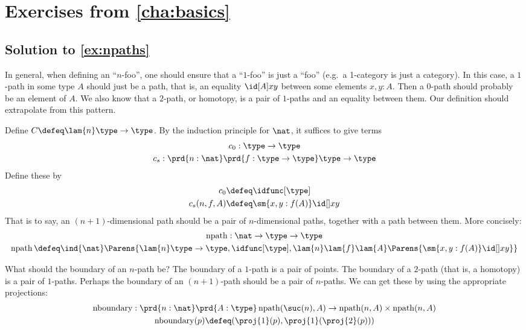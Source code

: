\documentclass[
%
%
11pt %
]{article}
\begin{document}
\section*{Exercises from \cref{cha:basics}}

\subsection*{Solution to \cref{ex:npaths}}

In general, when defining an ``$n$-foo'', one should ensure that a ``$1$-foo''
is just a ``foo'' (e.g.\ a 1-category is just a category). In this case, a
$1$-path in some type $A$ should just be a path, that is, an equality $\id[A]
xy$ between some elements $x,y:A$. Then a 0-path should probably be an
element of $A$. We also know that a $2$-path, or homotopy, is a pair of
$1$-paths and an equality between them. Our definition should extrapolate from
this pattern. 

Define $C\defeq \lam{n}\type\to\type$. By the induction principle for $\nat$, it
suffices to give terms
\begin{gather*}
  c_0 : \type\to\type \\
  c_s : \prd{n:\nat}\prd{f:\type\to\type}\type\to\type
\end{gather*}
Define these by
\begin{align*}
  c_0 &\defeq \idfunc[\type] \\
  c_s(n,f,A) &\defeq \sm{x,y:f(A)}\id[]xy
\end{align*}
That is to say, an $(n+1)$-dimensional path should be a pair of $n$-dimensional
paths, together with a path between them. More concisely:
\begin{gather*}
  \operatorname{npath} : \nat\to\type\to\type \\
  \operatorname{npath} \defeq \ind{\nat}\Parens{\lam{n}\type\to\type, \idfunc[\type], \lam{n}\lam{f}\lam{A}\Parens{\sm{x,y:f(A)}\id[]xy}}
\end{gather*}

What should the boundary of an $n$-path be? The boundary of a $1$-path is
a pair of points. The boundary of a $2$-path (that is, a homotopy) is a pair of
$1$-paths. Perhaps the boundary of an $(n+1)$-path should be a pair of
$n$-paths. We can get these by using the appropriate projections:
\begin{gather*}
  \operatorname{nboundary} :
  \prd{n:\nat}\prd{A:\type}\operatorname{npath}(\suc(n),A)\to
  \operatorname{npath}(n,A)\times \operatorname{npath}(n,A) \\
  \operatorname{nboundary}(p)\defeq (\proj{1}(p),\proj{1}(\proj{2}(p)))
\end{gather*}
\end{document}

